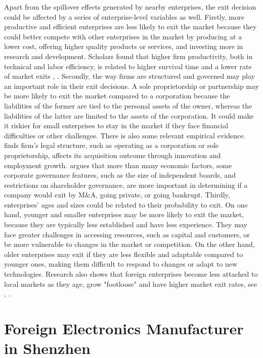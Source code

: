 Apart from the spillover effects generated by nearby enterprises, the exit decision could be affected by a series of enterprise-level variables as well. Firstly, more productive and efficient enterprises are less likely to exit the market because they could better compete with other enterprises in the market by producing at a lower cost, offering higher quality products or services, and investing more in research and development. Scholars found that higher firm productivity, both in technical and labor efficiency, is related to higher survival time and a lower rate of market exits \cite{muzi2022productivity}, \cite{aga2017market}. Secondly, the way firms are structured and governed may play an important role in their exit decisions. A sole proprietorship or partnership may be more likely to exit the market compared to a corporation because the liabilities of the former are tied to the personal assets of the owner, whereas the liabilities of the latter are limited to the assets of the corporation. It could make it riskier for small enterprises to stay in the market if they face financial difficulties or other challenges. There is also some relevant empirical evidence. \cite{cotei2018m} finds firm's legal structure, such as operating as a corporation or sole proprietorship, affects its acquisition outcome through innovation and employment growth. \cite{goktan2018corporate} argues that more than many economic factors, some corporate governance features, such as the size of independent boards, and restrictions on shareholder governance, are more important in determining if a company would exit by M\&A, going private, or going bankrupt. Thirdly, enterprises' ages and sizes could be related to their probability to exit. On one hand, younger and smaller enterprises may be more likely to exit the market, because they are typically less established and have less experience. They may face greater challenges in accessing resources, such as capital and customers, or be more vulnerable to changes in the market or competition. On the other hand, older enterprises may exit if they are less flexible and adaptable compared to younger ones, making them difficult to respond to changes or adapt to new technologies. Research also shows that foreign enterprises become less attached to local markets as they age, grow "footloose" and have higher market exit rates, see \cite{mata2012foreignness}, \cite{coucke2008offshoring}.

\section{Foreign Electronics Manufacturer in Shenzhen}

